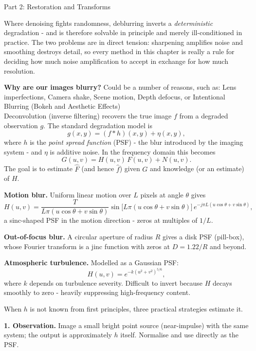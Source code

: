 \documentclass[letterpaper]{article}
\begin{document}
\begin{notes}{Part 2: Restoration and Transforms}

Where denoising fights randomness, deblurring inverts a \emph{deterministic} degradation - and is therefore solvable in principle and merely ill-conditioned in practice. The two problems are in direct tension: sharpening amplifies noise and smoothing destroys detail, so every method in this chapter is really a rule for deciding how much noise amplification to accept in exchange for how much resolution.


\textbf{Why are our images blurry?} Could be a number of reasons, such as: Lens imperfections, Camera shake, Scene motion, Depth defocus, or Intentional Blurring (Bokeh and Aesthetic Effects)\\

Deconvolution (inverse filtering) recovers the true image $f$ from a degraded observation $g$. The standard degradation model is
$$g(x,y) = (f * h)(x,y) + \eta(x,y),$$
where $h$ is the \emph{point spread function} (PSF) - the blur introduced by the imaging system - and $\eta$ is additive noise. In the frequency domain this becomes
$$G(u,v) = H(u,v)\,F(u,v) + N(u,v).$$
The goal is to estimate $\hat{F}$ (and hence $\hat{f}$) given $G$ and knowledge (or an estimate) of $H$.


\textbf{Motion blur.} Uniform linear motion over $L$ pixels at angle $\theta$ gives
$$H(u,v) = \frac{T}{L\pi(u\cos\theta+v\sin\theta)}\sin\!\bigl[L\pi(u\cos\theta+v\sin\theta)\bigr]\,e^{-j\pi L(u\cos\theta+v\sin\theta)},$$
a sinc-shaped PSF in the motion direction - zeros at multiples of $1/L$.

\textbf{Out-of-focus blur.} A circular aperture of radius $R$ gives a disk PSF (pill-box), whose Fourier transform is a jinc function with zeros at $D = 1.22/R$ and beyond.

\textbf{Atmospheric turbulence.} Modelled as a Gaussian PSF:
$$H(u,v) = e^{-k(u^2+v^2)^{5/6}},$$
where $k$ depends on turbulence severity. Difficult to invert because $H$ decays smoothly to zero - heavily suppressing high-frequency content.


When $h$ is not known from first principles, three practical strategies estimate it.

\textbf{1. Observation.} Image a small bright point source (near-impulse) with the same system; the output is approximately $h$ itself. Normalise and use directly as the PSF.


\end{notes}
\end{document}
